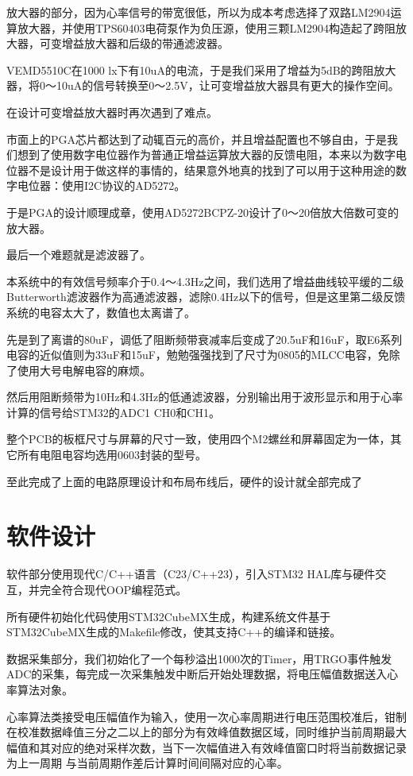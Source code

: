 \documentclass[a4paper]{ctexart}
\begin{document}
	放大器的部分，因为心率信号的带宽很低，所以为成本考虑选择了双路LM2904运算放大器，并使用TPS60403电荷泵作为负压源，使用三颗LM2904构造起了跨阻放大器，可变增益放大器和后级的带通滤波器。
	
	VEMD5510C在1000 lx下有10uA的电流，于是我们采用了增益为5dB的跨阻放大器，将0～10uA的信号转换至0～2.5V，让可变增益放大器具有更大的操作空间。
	
	在设计可变增益放大器时再次遇到了难点。
	
	市面上的PGA芯片都达到了动辄百元的高价，并且增益配置也不够自由，于是我们想到了使用数字电位器作为普通正增益运算放大器的反馈电阻，本来以为数字电位器不是设计用于做这样的事情的，结果意外地真的找到了可以用于这种用途的数字电位器：使用I2C协议的AD5272。
	
	于是PGA的设计顺理成章，使用AD5272BCPZ-20设计了0～20倍放大倍数可变的放大器。
	
	最后一个难题就是滤波器了。
	
	本系统中的有效信号频率介于0.4～4.3Hz之间，我们选用了增益曲线较平缓的二级Butterworth滤波器作为高通滤波器，滤除0.4Hz以下的信号，但是这里第二级反馈系统的电容太大了，数值也太离谱了。
	
	先是到了离谱的80uF，调低了阻断频带衰减率后变成了20.5uF和16uF，取E6系列电容的近似值则为33uF和15uF，勉勉强强找到了尺寸为0805的MLCC电容，免除了使用大号电解电容的麻烦。
	
	然后用阻断频带为10Hz和4.3Hz的低通滤波器，分别输出用于波形显示和用于心率计算的信号给STM32的ADC1 CH0和CH1。

	整个PCB的板框尺寸与屏幕的尺寸一致，使用四个M2螺丝和屏幕固定为一体，其它所有电阻电容均选用0603封装的型号。
	
	至此完成了上面的电路原理设计和布局布线后，硬件的设计就全部完成了

\newpage
\section{软件设计}

	软件部分使用现代C/C++语言（C23/C++23），引入STM32 HAL库与硬件交互，并完全符合现代OOP编程范式。
	
	所有硬件初始化代码使用STM32CubeMX生成，构建系统文件基于STM32CubeMX生成的Makefile修改，使其支持C++的编译和链接。
	
	数据采集部分，我们初始化了一个每秒溢出1000次的Timer，用TRGO事件触发ADC的采集，每完成一次采集触发中断后开始处理数据，将电压幅值数据送入心率算法对象。
	
	心率算法类接受电压幅值作为输入，使用一次心率周期进行电压范围校准后，钳制在校准数据峰值三分之二以上的部分为有效峰值数据区域，同时维护当前周期最大幅值和其对应的绝对采样次数，当下一次幅值进入有效峰值窗口时将当前数据记录为上一周期 与当前周期作差后计算时间间隔对应的心率。
	
\end{document}
